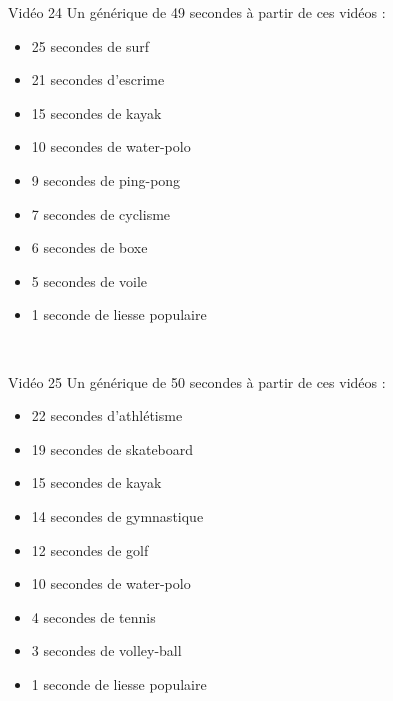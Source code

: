 \documentclass[10pt, a5paper,twoside]{article}
\begin{document}
\vfill

\begin{card}[width = \textwidth, colback = olympicyellow, colframe = olympicyellow, bottomtitle = 2mm]{Vidéo 24}
  Un générique de 49 secondes à partir de ces vidéos :
  \vspace{-1mm}\begin{itemize}
    \item 25 secondes de surf
    \item 21 secondes d'escrime
    \item 15 secondes de kayak
    \item 10 secondes de water-polo
    \item 9 secondes de ping-pong
    \item 7 secondes de cyclisme
    \item 6 secondes de boxe
    \item 5 secondes de voile
    \item 1 seconde de liesse populaire
  \end{itemize}
\end{card}

\vfill

\clearpage
~
\vfill

\begin{card}[width = \textwidth, colback = olympicyellow, colframe = olympicyellow, bottomtitle = 2mm]{Vidéo 25}
  Un générique de 50 secondes à partir de ces vidéos :
  \vspace{-1mm}\begin{itemize}
    \item 22 secondes d'athlétisme
    \item 19 secondes de skateboard
    \item 15 secondes de kayak
    \item 14 secondes de gymnastique
    \item 12 secondes de golf
    \item 10 secondes de water-polo
    \item 4 secondes de tennis
    \item 3 secondes de volley-ball
    \item 1 seconde de liesse populaire
  \end{itemize}
\end{card}

\vfill
\end{document}
